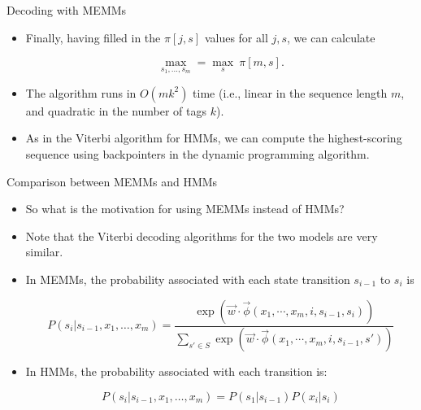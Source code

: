 \documentclass[handout]{beamer}
\begin{document}
\begin{frame}{Decoding with MEMMs}
\begin{scriptsize}

\begin{itemize}

\item  Finally, having filled in the $\pi[j,s]$ values for all $j, s$, we can calculate

\begin{displaymath}
  \max_{s_1,\dots,s_m} = \max_{s} \ \pi[m,s].
\end{displaymath}


\item The algorithm runs in $O(mk^2)$ time (i.e., linear in the sequence length $m$,
and quadratic in the number of tags $k$).


\item As in the Viterbi algorithm for HMMs, we can compute the highest-scoring sequence using backpointers in the dynamic programming algorithm.

\end{itemize}


\end{scriptsize}
\end{frame}


\begin{frame}{Comparison between MEMMs and HMMs}
\begin{scriptsize}

\begin{itemize}

\item  So what is the motivation for using MEMMs instead of HMMs?

\item Note that the Viterbi decoding algorithms for the two models are very similar. 

\item In MEMMs, the probability associated with each state transition $s_{i-1}$ to $s_i$ is

 \begin{displaymath}
 P(s_i | s_{i-1}, x_1, \dots, x_m)  =  \frac{\exp (\vec{w}\cdot \vec{\phi}(x_1, \cdots, x_m, i, s_{i-1},s_i))}{\sum_{s' \in S} \exp (\vec{w}\cdot \vec{\phi}(x_1, \cdots, x_m, i, s_{i-1},s'))}
\end{displaymath}


\item In HMMs, the probability associated with each transition is:

\begin{displaymath}
 P(s_i | s_{i-1}, x_1, \dots, x_m) = P(s_1|s_{i-1})P(x_i|s_i)
\end{displaymath}

\end{itemize}

\end{scriptsize}
\end{frame}
\end{document}
